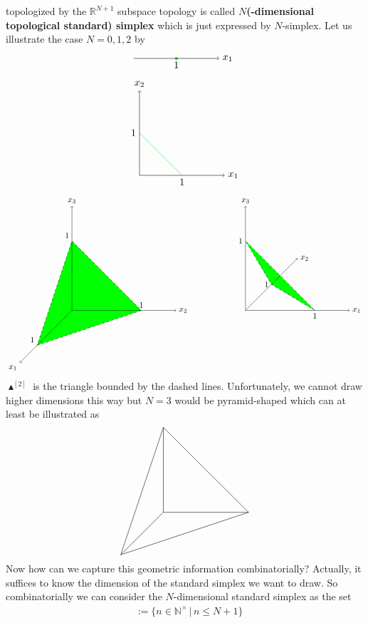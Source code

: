 topologized by the $\mathbb{R}^{N+1}$ subspace topology is called \textbf{$N$(-dimensional topological standard) simplex} which is just expressed by $N$-simplex. Let us illustrate the case $N = 0,1,2$ by
\[
\begin{tikzpicture}[scale=0.75]
  \fill[fill=green]
    (2,0) node[below] {$1$}
    circle
    (2pt);
  \draw[->]
    (0,0)
    --
    (4,0) node[right] {$x_{1}$};
\end{tikzpicture}
\]
\[
\begin{tikzpicture}[scale=0.75]
  \fill
    (2,0) node[below] {$1$}
    --
    (0,2) node[left] {$1$};
  \draw[green]
    (2,0)
    --
    (0,2);
  \draw[->]
    (0,0)
    --
    (4,0) node[right] {$x_{1}$};
  \draw[->]
    (0,0)
    --
    (0,4) node[above] {$x_{2}$};
\end{tikzpicture}
\]
\[
\begin{tikzpicture}[scale=0.75]
  \filldraw[dashed,fill=green]
    (-7,-2) node[above left] {$1$}
    --
    (-1,0) node[above] {$1$}
    --
    (-5,4) node[above left] {$1$}
    --
    cycle;
  \draw[->]
    (-5,0)
    --
    (-8,-3) node[below left] {$x_{1}$};
  \draw[->]
    (-5,0)
    --
    (1,0) node[right] {$x_{2}$};
  \draw[->]
    (-5,0)
    --
    (-5,6) node[above] {$x_{3}$};
  \filldraw[dashed,fill=green]
    (9,0) node[below] {$1$}
    --
    (6.5,1.5) node[left] {$1$}
    --
    (5,4) node[left] {$1$}
    --
    cycle;
  \draw[->]
    (5,0)
    --
    (11,0) node[right] {$x_{1}$};
  \draw[->]
    (5,0)
    --
    (8,3) node[right] {$x_{2}$};
  \draw[->]
    (5,0)
    --
    (5,6) node[above] {$x_{3}$};
\end{tikzpicture}
\]
$\blacktriangle^{[2]}$ is the triangle bounded by the dashed lines. Unfortunately, we cannot draw higher dimensions this way but $N = 3$ would be pyramid-shaped which can at least be illustrated as
\[
\begin{tikzpicture}[scale=0.75]
  \draw
    (-2,-2) 
    --
    (4,0)
    --
    (0,4)
    --
    cycle;
  \draw
    (0,0)
    --
    (-2,-2);
  \draw
    (0,0)
    --
    (4,0);
  \draw
    (0,0)
    --
    (0,4);
\end{tikzpicture}
\]
Now how can we capture this geometric information combinatorially? Actually, it suffices to know the dimension of the standard simplex we want to draw. So combinatorially we can consider the $N$-dimensional standard simplex as the set
\begin{align*}
  [N]
  &:=
  \lbrace
      n
      \in
      \mathbb{N}^{\times}
    \,
    \vert
    \,
      n
      \leq
      N
      +
      1
  \rbrace
\end{align*}
